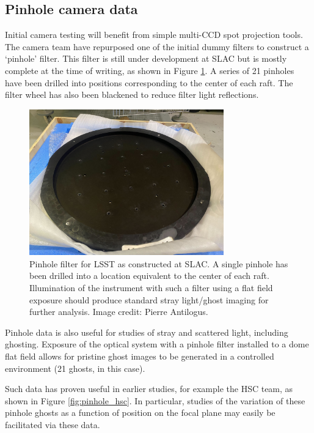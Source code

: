 \documentclass[SE,authoryear,toc]{lsstdoc}
\begin{document}
\subsection{Pinhole camera data}  \label{sec:pinhole}

Initial camera testing will benefit from simple multi-CCD spot projection tools.
The camera team have repurposed one of the initial dummy filters to construct a `pinhole' filter.
This filter is still under development at SLAC but is mostly complete at the time of writing, as shown in Figure \ref{fig:pinhole_lsst}.
A series of 21 pinholes have been drilled into positions corresponding to the center of each raft.
The filter wheel has also been blackened to reduce filter light reflections.

\begin{figure}
\centering
\includegraphics[width=0.75\textwidth]{fig/pinhole_filter_lsst}
\caption{
Pinhole filter for LSST as constructed at SLAC.
A single pinhole has been drilled into a location equivalent to the center of each raft.
Illumination of the instrument with such a filter using a flat field exposure should produce standard stray light/ghost imaging for further analysis.
Image credit: Pierre Antilogus.
}
\label{fig:pinhole_lsst}
\end{figure}

Pinhole data is also useful for studies of stray and scattered light, including ghosting.
Exposure of the optical system with a pinhole filter installed to a dome flat field allows for pristine ghost images to be generated in a controlled environment (21 ghosts, in this case).

Such data has proven useful in earlier studies, for example the HSC team, as shown in Figure \ref{fig:pinhole_hsc}.
In particular, studies of the variation of these pinhole ghosts as a function of position on the focal plane may easily be facilitated via these data.
\end{document}
